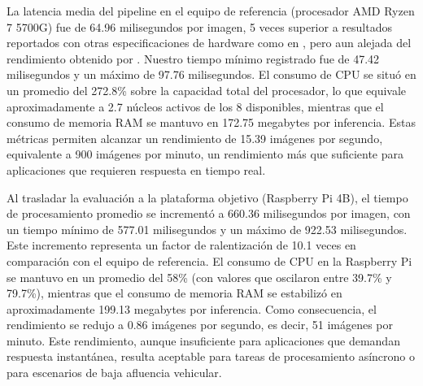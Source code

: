 La latencia media del pipeline en el equipo de referencia (procesador AMD Ryzen 7 5700G) fue de 64.96 milisegundos por imagen, 5 veces superior a resultados reportados con otras especificaciones de hardware como en \cite{hendry-chen2018}, pero aun alejada del rendimiento obtenido por \cite{li-chen2020}. Nuestro tiempo mínimo registrado fue de 47.42 milisegundos y un máximo de 97.76 milisegundos. El consumo de CPU se situó en un promedio del 272.8\% sobre la capacidad total del procesador, lo que equivale aproximadamente a 2.7 núcleos activos de los 8 disponibles, mientras que el consumo de memoria RAM se mantuvo en 172.75 megabytes por inferencia. Estas métricas permiten alcanzar un rendimiento de 15.39 imágenes por segundo, equivalente a 900 imágenes por minuto, un rendimiento más que suficiente para aplicaciones que requieren respuesta en tiempo real.

Al trasladar la evaluación a la plataforma objetivo (Raspberry Pi 4B), el tiempo de procesamiento promedio se incrementó a 660.36 milisegundos por imagen, con un tiempo mínimo de 577.01 milisegundos y un máximo de 922.53 milisegundos. Este incremento representa un factor de ralentización de 10.1 veces en comparación con el equipo de referencia. El consumo de CPU en la Raspberry Pi se mantuvo en un promedio del 58\% (con valores que oscilaron entre 39.7\% y 79.7\%), mientras que el consumo de memoria RAM se estabilizó en aproximadamente 199.13 megabytes por inferencia. Como consecuencia, el rendimiento se redujo a 0.86 imágenes por segundo, es decir, 51 imágenes por minuto. Este rendimiento, aunque insuficiente para aplicaciones que demandan respuesta instantánea, resulta aceptable para tareas de procesamiento asíncrono o para escenarios de baja afluencia vehicular.

